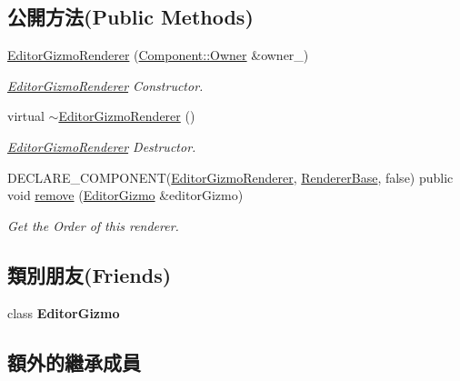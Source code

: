 \subsection*{公開方法(Public Methods)}
\begin{DoxyCompactItemize}
\item 
\hyperlink{class_magnum_1_1_editor_gizmo_renderer_aedbc41e9e363f1f864178863f94811db}{Editor\+Gizmo\+Renderer} (\hyperlink{class_magnum_1_1_component_1_1_owner}{Component\+::\+Owner} \&owner\+\_\+)
\begin{DoxyCompactList}\small\item\em \hyperlink{class_magnum_1_1_editor_gizmo_renderer}{Editor\+Gizmo\+Renderer} Constructor. \end{DoxyCompactList}\item 
virtual \hyperlink{class_magnum_1_1_editor_gizmo_renderer_a156f006706a76f89c9477d746e473ff0}{$\sim$\+Editor\+Gizmo\+Renderer} ()
\begin{DoxyCompactList}\small\item\em \hyperlink{class_magnum_1_1_editor_gizmo_renderer}{Editor\+Gizmo\+Renderer} Destructor. \end{DoxyCompactList}\item 
D\+E\+C\+L\+A\+R\+E\+\_\+\+C\+O\+M\+P\+O\+N\+E\+NT(\hyperlink{class_magnum_1_1_editor_gizmo_renderer}{Editor\+Gizmo\+Renderer}, \hyperlink{class_magnum_1_1_renderer_base}{Renderer\+Base}, false) public void \hyperlink{class_magnum_1_1_editor_gizmo_renderer_a0dcf079b1b9e1ec5f2eed0da99cacffa}{remove} (\hyperlink{class_magnum_1_1_editor_gizmo}{Editor\+Gizmo} \&editor\+Gizmo)
\begin{DoxyCompactList}\small\item\em Get the Order of this renderer. \end{DoxyCompactList}\end{DoxyCompactItemize}
\subsection*{類別朋友(Friends)}
\begin{DoxyCompactItemize}
\item 
class {\bfseries Editor\+Gizmo}\hypertarget{class_magnum_1_1_editor_gizmo_renderer_a7593666fc9fac59daeeaf5e5b4ca9b17}{}\label{class_magnum_1_1_editor_gizmo_renderer_a7593666fc9fac59daeeaf5e5b4ca9b17}

\end{DoxyCompactItemize}
\subsection*{額外的繼承成員}


